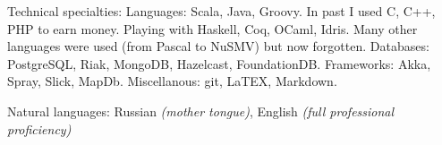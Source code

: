 \documentclass[10pt,a4paper]{article} %
\begin{document}


\inlineheadsection %
{Technical specialties:}
{Languages: Scala, Java, Groovy. In past I used C, C++, PHP to earn money. Playing with Haskell, Coq, OCaml, Idris. Many other languages were used (from Pascal to NuSMV) but now forgotten. Databases: PostgreSQL, Riak, MongoDB, Hazelcast, FoundationDB. Frameworks: Akka, Spray, Slick, MapDb.   
Miscellanous: git, LaTEX, Markdown.}


\inlineheadsection %
{Natural languages:}
{Russian \textit{(mother tongue)}, English \textit{(full professional proficiency)}}


\spacedhrule{1.6em}{-0.4em} %
\end{document}
